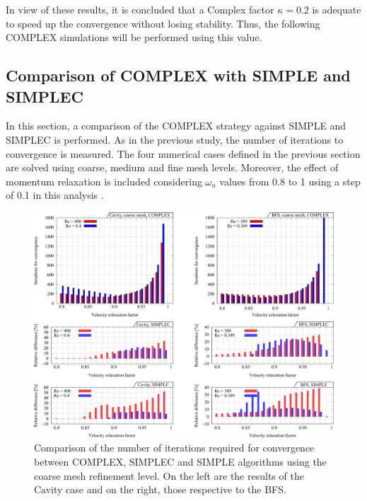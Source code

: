 \documentclass[final,3p,times,11pt,onecolumn]{myElsarticle}
\numberwithin{equation}{section}
\begin{document}
In view of these results, it is concluded that a Complex factor $\kappa = 0.2$ is adequate to speed up the convergence without losing stability. Thus, the following COMPLEX simulations will be performed using this value. %

 
\subsection{Comparison of COMPLEX with SIMPLE and SIMPLEC}
In this section, a comparison of the COMPLEX strategy against SIMPLE and SIMPLEC is performed.
As in the previous study, the number of iterations to convergence is measured. The four numerical cases defined in the previous section are solved using coarse, medium and fine mesh levels. Moreover, the effect of momentum relaxation is included considering $\omega_u$ values from 0.8 to 1 using a step of 0.1 in this analysis .
\begin{figure}[t!]
\centering
\includegraphics[width=17cm]{fig/Results/complexCoarse.pdf}
\caption{Comparison of the number of iterations required for convergence between COMPLEX, SIMPLEC and SIMPLE algorithms using the coarse mesh refinement level. On the left are the results of the Cavity case and on the right, those respective to the BFS.}
\label{Fig:complexCoarse}
\end{figure}
\end{document}
